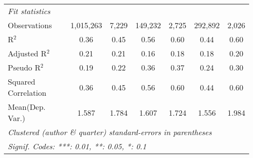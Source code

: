\begin{tabular}{lcccccc}
   \midrule
   \emph{Fit statistics}\\
   Observations                                               & 1,015,263      & 7,229        & 149,232       & 2,725   & 292,892        & 2,026\\  
   R$^2$                                                      & 0.36           & 0.45         & 0.56          & 0.60    & 0.44           & 0.60\\  
   Adjusted R$^2$                                             & 0.21           & 0.21         & 0.16          & 0.18    & 0.18           & 0.20\\  
   Pseudo R$^2$                                               & 0.19           & 0.22         & 0.36          & 0.37    & 0.24           & 0.30\\  
   Squared Correlation                                        & 0.36           & 0.45         & 0.56          & 0.60    & 0.44           & 0.60\\  
Mean(Dep. Var.) & 1.587 & 1.784 & 1.607 & 1.724 & 1.556 & 1.984 \\
   \midrule \midrule
   \multicolumn{7}{l}{\emph{Clustered (author \& quarter) standard-errors in parentheses}}\\
   \multicolumn{7}{l}{\emph{Signif. Codes: ***: 0.01, **: 0.05, *: 0.1}}\\
\end{tabular}
\par\endgroup
